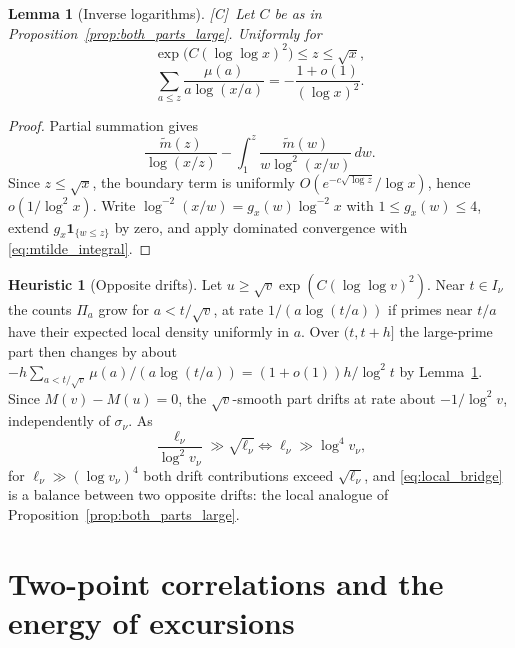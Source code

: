 \documentclass[11pt,reqno]{amsart}
\numberwithin{equation}{section}
\theoremstyle{plain}
\newtheorem{lemma}[theorem]{Lemma}
\theoremstyle{definition}
\newtheorem{heuristic}[theorem]{Heuristic}
\theoremstyle{remark}
\newcommand{\mt}{\widetilde{m}}
\newcommand{\tagC}{\textup{[C]}}
\begin{document}
\begin{lemma}[Inverse logarithms]
\label{lem:inverse_log_sum}
\tagC\ Let $C$ be as in Proposition~\ref{prop:both_parts_large}. Uniformly for
\begin{equation}
\exp\bigl(C(\log\log x)^2\bigr)\le z\le\sqrt x,
\end{equation}
\begin{equation}
\label{eq:inverse_log_sum}
  \sum_{a\le z}\frac{\mu(a)}{a\log(x/a)}=-\frac{1+o(1)}{(\log x)^2}.
\end{equation}
\end{lemma}

\begin{proof}
Partial summation gives
\begin{equation}
\frac{\mt(z)}{\log(x/z)}-
\int_1^z\frac{\mt(w)}{w\log^2(x/w)}\,dw.
\end{equation}
Since $z\le\sqrt x$, the boundary term is uniformly
$O(e^{-c\sqrt{\log z}}/\log x)$, hence $o(1/\log^2x)$. Write
$\log^{-2}(x/w)=g_x(w)\log^{-2}x$ with $1\le g_x(w)\le4$, extend
$g_x\mathbf1_{\{w\le z\}}$ by zero, and apply dominated convergence with
\eqref{eq:mtilde_integral}.
\end{proof}

\begin{heuristic}[Opposite drifts]
\label{heu:local_drift}
Let $u\ge\sqrt v\exp(C(\log\log v)^2)$. Near $t\in I_\nu$ the counts
$\Pi_a$ grow for $a<t/\sqrt v$, at rate $1/(a\log(t/a))$ if primes near
$t/a$ have their expected local density uniformly in $a$. Over $(t,t+h]$
the large-prime part then changes by about
$-h\sum_{a<t/\sqrt v}\mu(a)/(a\log(t/a))=(1+o(1))h/\log^2t$ by
Lemma~\ref{lem:inverse_log_sum}. Since $M(v)-M(u)=0$, the $\sqrt v$-smooth
part drifts at rate about $-1/\log^2v$, independently of $\sigma_\nu$. As
\begin{equation}
\frac{\ell_\nu}{\log^2v_\nu}\gg\sqrt{\ell_\nu}
\iff
\ell_\nu\gg\log^4v_\nu,
\end{equation}
for $\ell_\nu\gg(\log v_\nu)^4$ both drift contributions exceed
$\sqrt{\ell_\nu}$, and \eqref{eq:local_bridge} is a balance between two
opposite drifts: the local analogue of
Proposition~\ref{prop:both_parts_large}.
\end{heuristic}


\section{Two-point correlations and the energy of excursions}
\label{sec:chowla}
\end{document}
